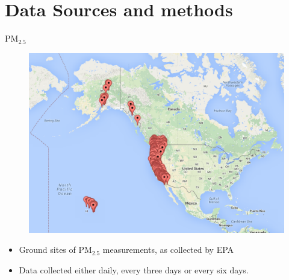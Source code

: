 \documentclass[notheorems,envcountsect,allowframebreaks,xcolor=svgnames,8pt]{beamer}
\begin{document}
\section{Data Sources and methods}
\begin{frame}{PM$_{2.5}$ }
\begin{figure}
\centering
\includegraphics[scale=0.3]{AllPMSites} 
\end{figure}

\begin{itemize}	
\item Ground sites of PM$_{2.5}$ measurements, as collected by EPA
\item Data collected either daily, every three days or every six days.
\end{itemize}	
\end{frame}
\end{document}
